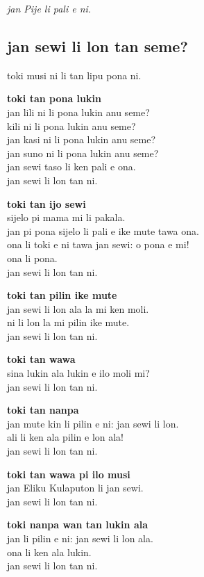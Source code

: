 \textit{jan Pije li pali e ni. \cite{www:Pije:01}}

\newpage

\subsection{jan sewi li lon tan seme?}

toki musi ni li tan lipu pona ni.

\textbf{toki tan pona lukin}   \\
jan lili ni li pona lukin anu seme?   \\
kili ni li pona lukin anu seme?   \\
jan kasi ni li pona lukin anu seme?   \\
jan suno ni li pona lukin anu seme?   \\
jan sewi taso li ken pali e ona.   \\
jan sewi li lon tan ni.

\textbf{toki tan ijo sewi}   \\
sijelo pi mama mi li pakala.   \\
jan pi pona sijelo li pali e ike mute tawa ona.   \\
ona li toki e ni tawa jan sewi: o pona e mi!   \\
ona li pona.   \\
jan sewi li lon tan ni.

\textbf{toki tan pilin ike mute}   \\
jan sewi li lon ala la mi ken moli.   \\
ni li lon la mi pilin ike mute.   \\
jan sewi li lon tan ni.

\textbf{toki tan wawa}   \\
sina lukin ala lukin e ilo moli mi?   \\
jan sewi li lon tan ni.

\textbf{toki tan nanpa}   \\
jan mute kin li pilin e ni: jan sewi li lon.   \\
ali li ken ala pilin e lon ala!   \\
jan sewi li lon tan ni.

\textbf{toki tan wawa pi ilo musi}   \\
jan Eliku Kulaputon li jan sewi.   \\
jan sewi li lon tan ni.

\textbf{toki nanpa wan tan lukin ala }   \\
jan li pilin e ni: jan sewi li lon ala.   \\
ona li ken ala lukin.   \\
jan sewi li lon tan ni.

